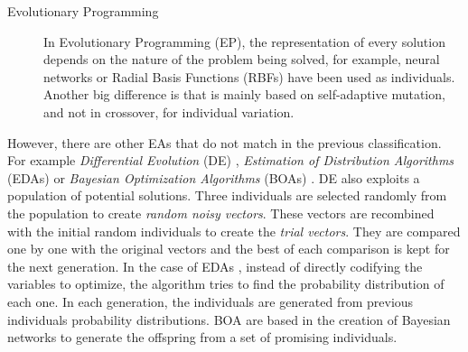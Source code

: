 \documentclass{article}
\begin{document}
\begin{description}
\item[Evolutionary Programming] In Evolutionary Programming (EP), the representation of every solution depends on the nature of the problem being solved, for example, neural networks \cite{Wang18NeuralNetworks} or Radial Basis Functions (RBFs) \cite{Gonzalez2003multiobjective} have been used as individuals. Another big difference is that is mainly based on self-adaptive mutation, and not in crossover, for individual variation.

\end{description}


However, there are other EAs that do not match in the previous
classification. For example \textit{Differential Evolution} (DE)
\cite{storn1997differential}, \textit{Estimation of Distribution
  Algorithms} (EDAs) \cite{larranaga2002estimation} or
\textit{Bayesian Optimization Algorithms} (BOAs)
\cite{pelikan2005bayesian}. DE \cite{storn1997differential} also
exploits a population of potential solutions. Three individuals are
selected randomly from the population to create \textit{random noisy
  vectors}. These vectors are recombined with the initial random
individuals to create the \textit{trial vectors}. They are compared
one by one with the original vectors and the best of each comparison
is kept for the next generation. In the case of EDAs
\cite{larranaga2002estimation}, instead of directly codifying the
variables to optimize, the algorithm tries to find the probability
distribution of each one. In each generation, the individuals are
generated from previous individuals probability distributions. BOA
\cite{pelikan2005bayesian} are based in the creation of Bayesian
networks to generate the offspring from a set of promising
individuals. %
\end{document}
